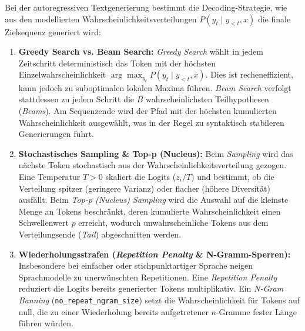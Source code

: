Bei der autoregressiven Textgenerierung bestimmt die Decoding-Strategie, wie aus den modellierten Wahrscheinlichkeitsverteilungen $P(y_t \mid y_{<t}, x)$ die finale Zielsequenz generiert wird:
\begin{enumerate}
    \item \textbf{Greedy Search vs. Beam Search:} \textit{Greedy Search} wählt in jedem Zeitschritt deterministisch das Token mit der höchsten Einzelwahrscheinlichkeit $\arg\max_{y_t} P(y_t \mid y_{<t}, x)$. Dies ist recheneffizient, kann jedoch zu suboptimalen lokalen Maxima führen. \textit{Beam Search} verfolgt stattdessen zu jedem Schritt die $B$ wahrscheinlichsten Teilhypothesen (\textit{Beams}). Am Sequenzende wird der Pfad mit der höchsten kumulierten Wahrscheinlichkeit ausgewählt, was in der Regel zu syntaktisch stabileren Generierungen führt.
    \item \textbf{Stochastisches Sampling \& Top-p (Nucleus):} Beim \textit{Sampling} wird das nächste Token stochastisch aus der Wahrscheinlichkeitsverteilung gezogen. Eine Temperatur $T > 0$ skaliert die Logits ($z_i / T$) und bestimmt, ob die Verteilung spitzer (geringere Varianz) oder flacher (höhere Diversität) ausfällt. Beim \textit{Top-p (Nucleus) Sampling} wird die Auswahl auf die kleinste Menge an Tokens beschränkt, deren kumulierte Wahrscheinlichkeit einen Schwellenwert $p$ erreicht, wodurch unwahrscheinliche Tokens aus dem Verteilungsende (\textit{Tail}) abgeschnitten werden.
    \item \textbf{Wiederholungsstrafen (\textit{Repetition Penalty} \& N-Gramm-Sperren):} Insbesondere bei einfacher oder stichpunktartiger Sprache neigen Sprachmodelle zu unerwünschten Repetitionen. Eine \textit{Repetition Penalty} reduziert die Logits bereits generierter Tokens multiplikativ. Ein \textit{N-Gram Banning} (\texttt{no\_repeat\_ngram\_size}) setzt die Wahrscheinlichkeit für Tokens auf null, die zu einer Wiederholung bereits aufgetretener $n$-Gramme fester Länge führen würden.
\end{enumerate}

